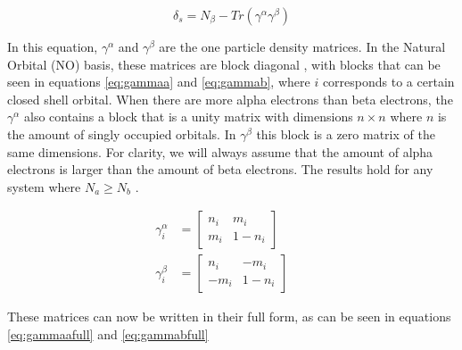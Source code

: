 \documentclass[twoside,twocolumn,9pt]{article}
\begin{document}
\begin{equation}\label{eq:spincont2}
  \delta_s = N_\beta - Tr(\gamma^\alpha\gamma^\beta)
\end{equation}

In this equation, $\gamma^{\alpha}$ and $\gamma^\beta$ are the one particle density matrices. In the Natural Orbital (NO) basis, these matrices are block diagonal
\cite{Scuseria2010}, with blocks that can be seen in equations \eqref{eq:gammaa} and \eqref{eq:gammab}, where $i$ corresponds to a certain closed shell orbital. When there are more
alpha electrons than beta electrons,
the $\gamma^\alpha$ also contains a block that is a unity matrix with dimensions $n\times n$ where $n$ is the amount of singly occupied orbitals. In $\gamma^\beta$ this block is a
zero matrix of the same dimensions. For clarity, we will always assume that the amount of alpha electrons is larger than the amount of beta electrons. The results hold for any system
where $N_a \geq N_b $ \cite{Scuseria2010}.

\begin{subequations}
  \begin{align}
    \label{eq:gammaa}
    \gamma^\alpha_i & = \begin{bmatrix}
      n_i & m_i    \\
      m_i & 1- n_i
    \end{bmatrix} &  & \\
    \label{eq:gammab}
    \gamma^\beta_i  & = \begin{bmatrix}
      n_i  & -m_i  \\
      -m_i & 1-n_i
    \end{bmatrix} &  &
  \end{align}
\end{subequations}

These matrices can now be written in their full form, as can be seen in equations \eqref{eq:gammaafull} and \eqref{eq:gammabfull}
\end{document}
